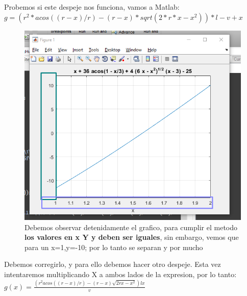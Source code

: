 \documentclass{article}
\theoremstyle{mytheoremstyle}
\theoremstyle{mytheoremstyle}
\theoremstyle{myproblemstyle}
\begin{document}
Probemos si este despeje nos funciona, vamos a Matlab: $g=(r^2*acos((r-x)/r)-(r-x)*sqrt(2*r*x-x^2))*l-v+x$
\begin{figure}[ht]
    \includegraphics[scale=0.7]{img/stf4.png}{\\Debemos observar detenidamente el grafico, para cumplir el metodo \textbf{los valores en x Y y deben ser iguales}, sin embargo, vemos que para un x=1,y=-10; por lo tanto se separan y por mucho}
    \end{figure}

Debemos corregirlo, y para ello debemos hacer otro despeje. Esta vez intentaremos multiplicando X a ambos lados de la expresion, por lo tanto:
$g(x)=\frac{(r^2acos((r-x)/r)-(r-x)\sqrt{2rx-x^2})lx}{v}$
\end{document}
